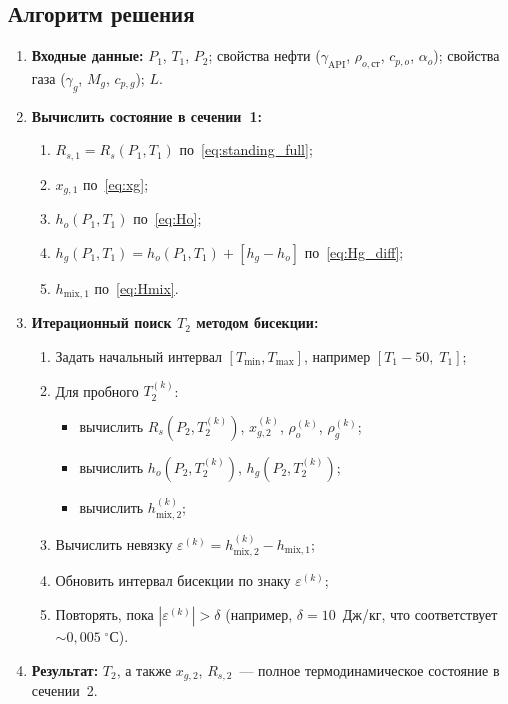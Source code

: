 \documentclass[12pt,a4paper]{article}
\begin{document}
\subsection{Алгоритм решения}

\begin{enumerate}
  \item \textbf{Входные данные:} $P_1$, $T_1$, $P_2$; свойства нефти
        ($\gamma_{\mathrm{API}}$, $\rho_{o,\text{ст}}$, $c_{p,o}$,
        $\alpha_o$); свойства газа ($\gamma_g$, $M_g$, $c_{p,g}$); $L$.

  \item \textbf{Вычислить состояние в сечении~1:}
    \begin{enumerate}[nosep]
      \item $R_{s,1} = R_s(P_1, T_1)$ по~\eqref{eq:standing_full};
      \item $x_{g,1}$ по~\eqref{eq:xg};
      \item $h_o(P_1, T_1)$ по~\eqref{eq:Ho};
      \item $h_g(P_1, T_1) = h_o(P_1,T_1) + [h_g - h_o]$ по~\eqref{eq:Hg_diff};
      \item $h_{\mathrm{mix},1}$ по~\eqref{eq:Hmix}.
    \end{enumerate}

  \item \textbf{Итерационный поиск $T_2$ методом бисекции:}
    \begin{enumerate}[nosep]
      \item Задать начальный интервал $[T_{\min}, T_{\max}]$, например
            $[T_1 - 50, \; T_1]$;
      \item Для пробного $T_2^{(k)}$:
        \begin{itemize}[nosep]
          \item вычислить $R_s(P_2, T_2^{(k)})$, $x_{g,2}^{(k)}$,
                $\rho_o^{(k)}$, $\rho_g^{(k)}$;
          \item вычислить $h_o(P_2, T_2^{(k)})$,
                $h_g(P_2, T_2^{(k)})$;
          \item вычислить $h_{\mathrm{mix},2}^{(k)}$;
        \end{itemize}
      \item Вычислить невязку
            $\varepsilon^{(k)} = h_{\mathrm{mix},2}^{(k)} - h_{\mathrm{mix},1}$;
      \item Обновить интервал бисекции по знаку $\varepsilon^{(k)}$;
      \item Повторять, пока $|\varepsilon^{(k)}| > \delta$ (например,
            $\delta = 10$~Дж/кг, что соответствует ${\sim}0{,}005\;{}^\circ$С).
    \end{enumerate}

  \item \textbf{Результат:} $T_2$, а также $x_{g,2}$, $R_{s,2}$~--- полное
        термодинамическое состояние в сечении~2.
\end{enumerate}
\end{document}
